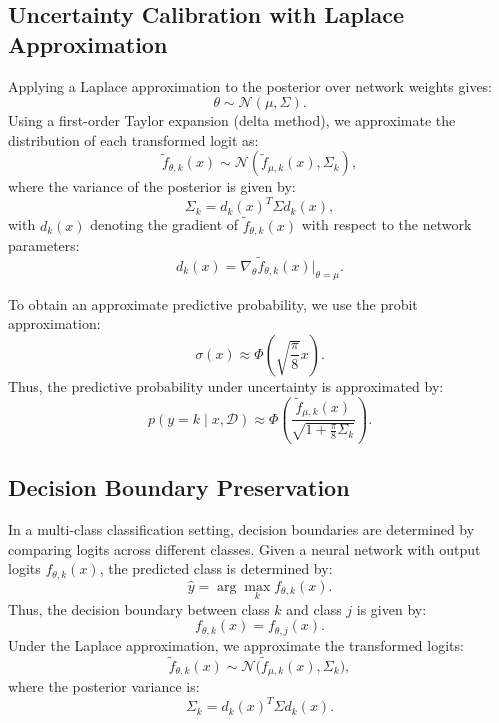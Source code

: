 \documentclass{article}
\begin{document}
\subsection{Uncertainty Calibration with Laplace Approximation}
Applying a Laplace approximation to the posterior over network weights gives:
\begin{equation}
\theta \sim \mathcal{N}(\mu, \Sigma).
\end{equation}
Using a first-order Taylor expansion (delta method), we approximate the distribution of each transformed logit as:
\begin{equation}
\tilde{f}_{\theta,k}(x) \sim \mathcal{N}(\tilde{f}_{\mu,k}(x), \Sigma_k),
\end{equation}
where the variance of the posterior is given by:
\begin{equation}
\Sigma_k = d_k(x)^T \Sigma d_k(x),
\end{equation}
with \( d_k(x) \) denoting the gradient of \( \tilde{f}_{\theta,k}(x) \) with respect to the network parameters:
\begin{equation}
d_k(x) = \nabla_{\theta} \tilde{f}_{\theta,k}(x) \Big|_{\theta = \mu}.
\end{equation}

To obtain an approximate predictive probability, we use the probit approximation:
\begin{equation}
\sigma(x) \approx \Phi\left( \sqrt{\frac{\pi}{8}} x \right).
\end{equation}
Thus, the predictive probability under uncertainty is approximated by:
\begin{equation}
p(y = k \mid x, \mathcal{D}) \approx \Phi\left( \frac{\tilde{f}_{\mu,k}(x)}{\sqrt{1+\frac{\pi}{8} \Sigma_k}} \right).
\end{equation}


\subsection{Decision Boundary Preservation}

In a multi-class classification setting, decision boundaries are determined by comparing logits across different classes. Given a neural network with output logits \( f_{\theta, k}(x) \), the predicted class is determined by:
\begin{equation}
    \hat{y} = \arg\max_{k} f_{\theta, k}(x).
\end{equation}
Thus, the decision boundary between class \( k \) and class \( j \) is given by:
\begin{equation}
    f_{\theta, k}(x) = f_{\theta, j}(x).
\end{equation}
Under the Laplace approximation, we approximate the transformed logits:
\begin{equation}
    \tilde{f}_{\theta,k}(x) \sim \mathcal{N}\bigl(\tilde{f}_{\mu,k}(x), \Sigma_k\bigr),
\end{equation}
where the posterior variance is:
\begin{equation}
    \Sigma_k = d_k(x)^T \Sigma d_k(x).
\end{equation}
\end{document}
